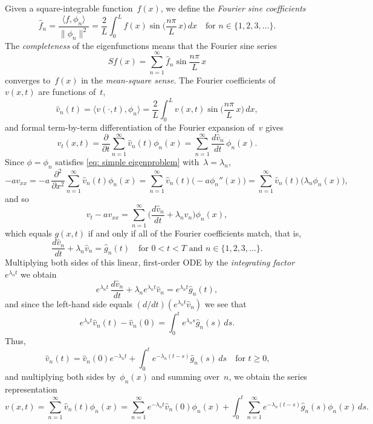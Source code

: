 Given a square-integrable function~$f(x)$, we define the 
\emph{Fourier sine coefficients}
\[
\hat f_n=\frac{\langle f,\phi_n\rangle}{\|\phi_n\|^2}
    =\frac{2}{L}\int_0^Lf(x)\sin\biggl(\frac{n\pi}{L}\,x\biggr)\,dx
    \quad\text{for $n\in\{1,2,3,\ldots\}$.}
\]
The \emph{completeness} of the eigenfunctions means that the Fourier sine series
\[
Sf(x)=\sum_{n=1}^\infty\hat f_n\sin\frac{n\pi}{L}\,x
\]
converges to~$f(x)$ in the \emph{mean-square sense}.  The Fourier coefficients 
of~$v(x,t)$ are functions of~$t$,
\[
\hat v_n(t)=\langle v(\cdot,t),\phi_n\rangle
    =\frac{2}{L}\int_0^Lv(x,t)\sin\biggl(\frac{n\pi}{L}\,x\biggr)\,dx,
\]
and formal term-by-term differentiation of the Fourier expansion of~$v$ gives
\[
v_t(x,t)=\frac{\partial}{\partial t}\sum_{n=1}^\infty\hat v_n(t)\phi_n(x)
    =\sum_{n=1}^\infty\frac{d\hat v_n}{dt}\,\phi_n(x).
\]
Since $\phi=\phi_n$ satisfies \eqref{eq: simple eigenproblem} 
with~$\lambda=\lambda_n$,
\[
-av_{xx}=-a\,\frac{\partial^2}{\partial x^2}
    \sum_{n=1}^\infty\hat v_n(t)\phi_n(x)
    =\sum_{n=1}^\infty\hat v_n(t)\bigl(-a\phi_n''(x)\bigr)
    =\sum_{n=1}^\infty\hat v_n(t)\bigl(\lambda_n\phi_n(x)\bigr),
\]
and so
\[
v_t-av_{xx}=\sum_{n=1}^\infty
	\biggl(\frac{d\hat v_n}{dt}+\lambda_n\hat v_n\biggr)\phi_n(x),
\]
which equals $g(x,t)$ if and only if all of the Fourier coefficients match, 
that is,
\[
\frac{d\hat v_n}{dt}+\lambda_n\hat v_n=\hat g_n(t)
    \quad\text{for $0<t<T$ and $n\in\{1,2,3,\ldots\}$.}
\]
Multiplying both sides of this linear, first-order ODE by the 
\emph{integrating factor}~$e^{\lambda_n t}$ we obtain
\[
e^{\lambda_nt}\,\frac{d\hat v_n}{dt}+\lambda_ne^{\lambda_nt}\hat v_n
	=e^{\lambda_nt}\hat g_n(t),
\]
and since the left-hand side equals $(d/dt)(e^{\lambda_nt}\hat v_n)$ we see that
\[
e^{\lambda_nt}\hat v_n(t)-\hat v_n(0)=\int_0^te^{\lambda_ns}\hat g_n(s)\,ds.
\]
Thus,
\begin{equation}\label{eq: Duhamel n}
\hat v_n(t)=\hat v_n(0)e^{-\lambda_nt}
	+\int_0^te^{-\lambda_n(t-s)}\hat g_n(s)\,ds\quad\text{for $t\ge0$,}
\end{equation}
and multiplying both sides by~$\phi_n(x)$ and summing over~$n$, we obtain the
series representation
\[
v(x,t)=\sum_{n=1}^\infty\hat v_n(t)\phi_n(x)
	=\sum_{n=1}^\infty e^{-\lambda_nt}\hat v_n(0)\phi_n(x)
	+\int_0^t\sum_{n=1}^\infty e^{-\lambda_n(t-s)}\hat g_n(s)\phi_n(x)\,ds.
\]

